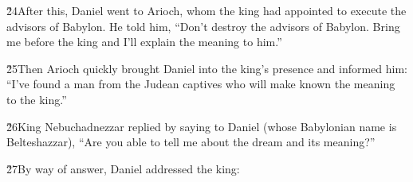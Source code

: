 \v{24}After this, Daniel went to Arioch, whom the king had appointed to execute the advisors of Babylon. He told him, ``Don't destroy the advisors of Babylon. Bring me before the king and I'll explain the meaning to him.''

\v{25}Then Arioch quickly brought Daniel into the king's presence and informed him: ``I've found a man from the Judean captives who will make known the meaning to the king.''

\v{26}King Nebuchadnezzar replied by saying to Daniel (whose Babylonian name is Belteshazzar), ``Are you able to tell me about the dream and its meaning?''

\v{27}By way of answer, Daniel addressed the king:

